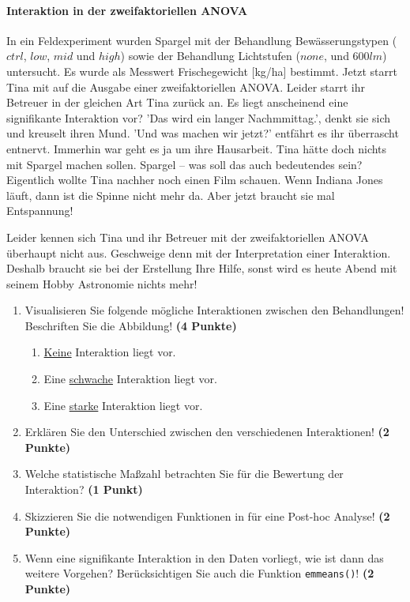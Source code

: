 \documentclass[a4paper, 9pt]{scrartcl}\usepackage[]{graphicx}\usepackage[]{xcolor}
\begin{document}
\paragraph{Interaktion in der zweifaktoriellen ANOVA}

In ein Feldexperiment wurden Spargel mit der Behandlung Bewässerungstypen ($ctrl$, $low$, $mid$ und $high$) sowie der Behandlung Lichtstufen ($none$, und $600lm$) untersucht. Es wurde als Messwert Frischegewicht [kg/ha] bestimmt. Jetzt starrt Tina mit auf die \Rlogo Ausgabe einer zweifaktoriellen ANOVA. Leider starrt ihr Betreuer in der gleichen Art Tina zurück an. Es liegt anscheinend eine signifikante Interaktion vor? 'Das wird ein langer Nachmmittag.', denkt sie sich und kreuselt ihren Mund. 'Und was machen wir jetzt?' entfährt es ihr überrascht entnervt. Immerhin war geht es ja um ihre Hausarbeit. Tina hätte doch nichts mit Spargel machen sollen. Spargel -- was soll das auch bedeutendes sein? Eigentlich wollte Tina nachher noch einen Film schauen. Wenn Indiana Jones läuft, dann ist die Spinne nicht mehr da. Aber jetzt braucht sie mal Entspannung!

\vspace{1ex}

Leider kennen sich Tina und ihr Betreuer mit der zweifaktoriellen ANOVA überhaupt nicht aus. Geschweige denn mit der Interpretation einer Interaktion. Deshalb braucht sie bei der Erstellung Ihre Hilfe, sonst wird es heute Abend mit seinem Hobby Astronomie nichts mehr! 

\begin{enumerate}
\item Visualisieren Sie folgende mögliche Interaktionen zwischen den Behandlungen! Beschriften Sie die Abbildung! \textbf{(4 Punkte)}
\begin{enumerate}
\item \underline{Keine} Interaktion liegt vor.
\item Eine \underline{schwache} Interaktion liegt vor. 
\item Eine \underline{starke} Interaktion liegt vor. 
\end{enumerate}
\item Erklären Sie den Unterschied zwischen den verschiedenen Interaktionen! \textbf{(2 Punkte)}
\item Welche statistische Maßzahl betrachten Sie für die Bewertung der Interaktion? \textbf{(1 Punkt)}
\item Skizzieren Sie die notwendigen Funktionen in \Rlogo für eine Post-hoc Analyse! \textbf{(2 Punkte)} 
\item Wenn eine signifikante Interaktion in den Daten vorliegt, wie ist dann das weitere Vorgehen? Berücksichtigen Sie auch die Funktion \texttt{emmeans()}! \textbf{(2 Punkte)}
\end{enumerate}
\end{document}
